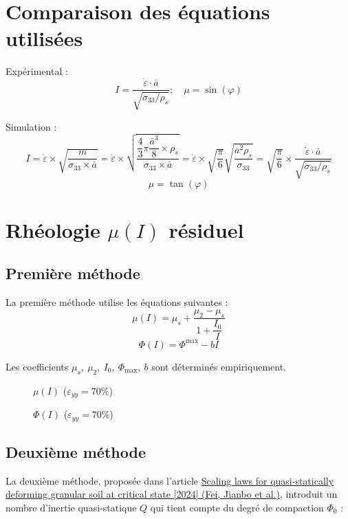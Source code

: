 \documentclass[a4paper,12pt]{report}
\begin{document}
\begin{table}
\section{Comparaison des équations utilisées}

Expérimental : 
\[
I =  \dfrac{\dot{\varepsilon} \cdot \bar{a}}{\sqrt{\sigma_{33}/\rho_s}}; \quad \mu = \sin(\varphi)
\]

Simulation : 
\[
I = \dot{\varepsilon} \times \sqrt {\dfrac{m}{\sigma_{33}\times \bar{a}}}  
= \dot{\varepsilon} \times \sqrt {\dfrac{\dfrac{4}{3} \pi \dfrac{\bar{a}^3}{8} \times \rho_s}{\sigma_{33}\times \bar{a}}} 
= \dot{\varepsilon} \times \sqrt{\dfrac{\pi}{6}} \sqrt {\dfrac{\bar{a}^2 \rho_s}{\sigma_{33}}} 
= \boxed{\sqrt{\dfrac{\pi}{6}}} \times \dfrac{\dot{\varepsilon} \cdot \bar{a}}{\sqrt{\sigma_{33}/\rho_s}}
\]
\[
\mu = \tan(\varphi)
\]

\section{Rhéologie $\mu(I)$ résiduel}

\subsection{Première méthode}

La première méthode utilise les équations suivantes :
\[
\mu(I) = \mu_s + \dfrac{\mu_2 - \mu_s}{1 + \dfrac{I_0}{I}}
\]
\[
\Phi(I) = \Phi^{\max} - bI
\]

Les coefficients $\mu_s,\ \mu_2,\ I_0,\ \Phi_{\max},\ b$ sont déterminés empiriquement.

\begin{figure}
    \centering
    {\small
        
    }
    \caption{$\mu(I)$ ($\varepsilon_{yy} = 70\%$)}
\end{figure}

\begin{figure}
    \centering
    {\small
        
    }
    \caption{$\Phi(I)$ ($\varepsilon_{yy} = 70\%$)}
\end{figure}

\subsection{Deuxième méthode}

La deuxième méthode, proposée dans l'article 
\href{https://link-springer-com.sid2nomade-1.grenet.fr/article/10.1007/s10035-024-01459-7}{Scaling laws for quasi-statically deforming granular soil at critical state [2024] (Fei, Jianbo et al.)}, 
introduit un nombre d'inertie quasi-statique $Q$ qui tient compte du degré de compaction $\Phi_0$ :


\end{table}
\end{document}
